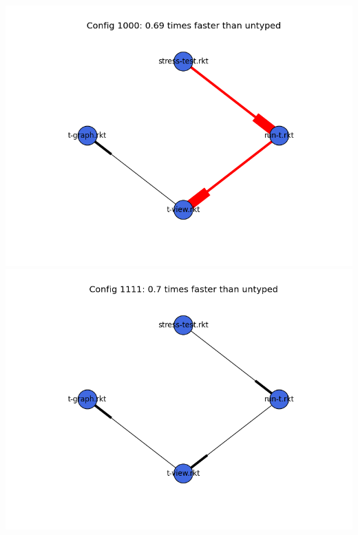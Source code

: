 \documentclass{article}
\begin{document}
\begin{itemize}
\includegraphics[width=\textwidth]{mbta-base-module-graph-1000.png}
\includegraphics[width=\textwidth]{mbta-base-module-graph-1111.png}
\end{itemize}
\end{document}
